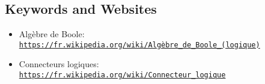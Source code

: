 \documentclass[a4paper,11pt]{report}
\newcommand{\BrochureUrlText}[1]{\texttt{#1}}
\begin{document}
{\raggedright

\subsection*{Keywords and Websites}

\begin{itemize}
  \item Algèbre de Boole: \href{https://fr.wikipedia.org/wiki/Alg\%C3\%A8bre_de_Boole_(logique)}{\BrochureUrlText{https://fr.wikipedia.org/wiki/Algèbre\_de\_Boole\_(logique)}}
  \item Connecteurs logiques: \href{https://fr.wikipedia.org/wiki/Connecteur_logique}{\BrochureUrlText{https://fr.wikipedia.org/wiki/Connecteur\_logique}}
\end{itemize}


}
\end{document}
